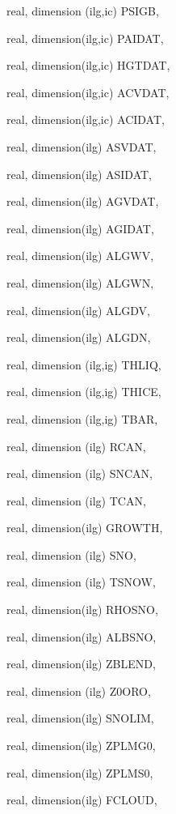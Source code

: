 {\begin{DoxyParamCaption}
\item[{real, dimension (ilg,ic)}]{P\+S\+I\+G\+B, }
\item[{real, dimension(ilg,ic)}]{P\+A\+I\+D\+A\+T, }
\item[{real, dimension(ilg,ic)}]{H\+G\+T\+D\+A\+T, }
\item[{real, dimension(ilg,ic)}]{A\+C\+V\+D\+A\+T, }
\item[{real, dimension(ilg,ic)}]{A\+C\+I\+D\+A\+T, }
\item[{real, dimension(ilg)}]{A\+S\+V\+D\+A\+T, }
\item[{real, dimension(ilg)}]{A\+S\+I\+D\+A\+T, }
\item[{real, dimension(ilg)}]{A\+G\+V\+D\+A\+T, }
\item[{real, dimension(ilg)}]{A\+G\+I\+D\+A\+T, }
\item[{real, dimension(ilg)}]{A\+L\+G\+W\+V, }
\item[{real, dimension(ilg)}]{A\+L\+G\+W\+N, }
\item[{real, dimension(ilg)}]{A\+L\+G\+D\+V, }
\item[{real, dimension(ilg)}]{A\+L\+G\+D\+N, }
\item[{real, dimension (ilg,ig)}]{T\+H\+L\+I\+Q, }
\item[{real, dimension (ilg,ig)}]{T\+H\+I\+C\+E, }
\item[{real, dimension  (ilg,ig)}]{T\+B\+A\+R, }
\item[{real, dimension  (ilg)}]{R\+C\+A\+N, }
\item[{real, dimension (ilg)}]{S\+N\+C\+A\+N, }
\item[{real, dimension  (ilg)}]{T\+C\+A\+N, }
\item[{real, dimension(ilg)}]{G\+R\+O\+W\+T\+H, }
\item[{real, dimension   (ilg)}]{S\+N\+O, }
\item[{real, dimension (ilg)}]{T\+S\+N\+O\+W, }
\item[{real, dimension(ilg)}]{R\+H\+O\+S\+N\+O, }
\item[{real, dimension(ilg)}]{A\+L\+B\+S\+N\+O, }
\item[{real, dimension(ilg)}]{Z\+B\+L\+E\+N\+D, }
\item[{real, dimension (ilg)}]{Z0\+O\+R\+O, }
\item[{real, dimension(ilg)}]{S\+N\+O\+L\+I\+M, }
\item[{real, dimension(ilg)}]{Z\+P\+L\+M\+G0, }
\item[{real, dimension(ilg)}]{Z\+P\+L\+M\+S0, }
\item[{real, dimension(ilg)}]{F\+C\+L\+O\+U\+D, }

\end{DoxyParamCaption}}
